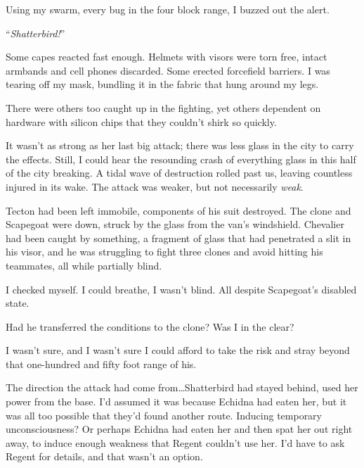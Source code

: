 Using my swarm, every bug in the four block range, I buzzed out the alert.



``\emph{Shatterbird!}''



Some capes reacted fast enough.  Helmets with visors were torn free, intact armbands and cell phones discarded.  Some erected forcefield barriers.  I was tearing off my mask, bundling it in the fabric that hung around my legs.



There were others too caught up in the fighting, yet others dependent on hardware with silicon chips that they couldn't shirk so quickly.



It wasn't as strong as her last big attack; there was less glass in the city to carry the effects.  Still, I could hear the resounding crash of everything glass in this half of the city breaking.  A tidal wave of destruction rolled past us, leaving countless injured in its wake.  The attack was weaker, but not necessarily \emph{weak}.



Tecton had been left immobile, components of his suit destroyed.  The clone and Scapegoat were down, struck by the glass from the van's windshield.  Chevalier had been caught by something, a fragment of glass that had penetrated a slit in his visor, and he was struggling to fight three clones and avoid hitting his teammates, all while partially blind.



I checked myself.  I could breathe, I wasn't blind.  All despite Scapegoat's disabled state.



Had he transferred the conditions to the clone?  Was I in the clear?



I wasn't sure, and I wasn't sure I could afford to take the risk and stray beyond that one-hundred and fifty foot range of his.



The direction the attack had come from\ldots  Shatterbird had stayed behind, used her power from the base.  I'd assumed it was because Echidna had eaten her, but it was all too possible that they'd found another route.  Inducing temporary unconsciousness?  Or perhaps Echidna had eaten her and then spat her out right away, to induce enough weakness that Regent couldn't use her.  I'd have to ask Regent for details, and that wasn't an option.



